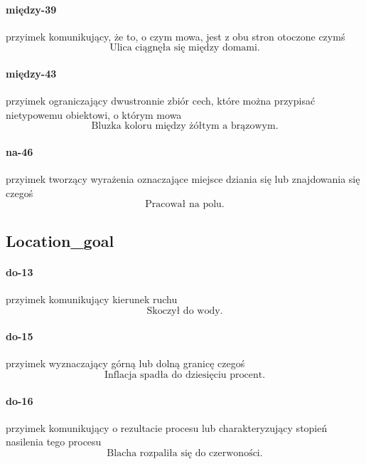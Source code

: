 \documentclass[a4paper, 12pt]{article}
\theoremstyle{remark}
\begin{document}
\paragraph{między-39} \label{prep-39}	przyimek komunikujący, że to, o czym mowa, jest z obu stron otoczone czymś
\begin{equation}
\text{Ulica ciągnęła się między domami.}
\end{equation}
\paragraph{między-43} \label{prep-43}	przyimek ograniczający dwustronnie zbiór cech, które można przypisać nietypowemu obiektowi, o którym mowa
\begin{equation}
\text{Bluzka koloru między żółtym a brązowym.}
\end{equation}
\paragraph{na-46} \label{prep-46}	przyimek tworzący wyrażenia oznaczające miejsce dziania się lub znajdowania się czegoś
\begin{equation}
\text{Pracował na polu.}
\end{equation}

\subsection{Location\_goal} %
\label{sub:location_goal}
\paragraph{do-13} \label{prep-13}	przyimek komunikujący kierunek ruchu
\begin{equation}
\text{Skoczył do wody.}
\end{equation}
\paragraph{do-15} \label{prep-15}	przyimek wyznaczający górną lub dolną granicę czegoś
\begin{equation}
\text{Inflacja spadła do dziesięciu procent.}
\end{equation}
\paragraph{do-16} \label{prep-16}	przyimek komunikujący o rezultacie procesu lub charakteryzujący stopień nasilenia tego procesu
\begin{equation}
\text{Blacha rozpaliła się do czerwoności.}
\end{equation}
\end{document}
